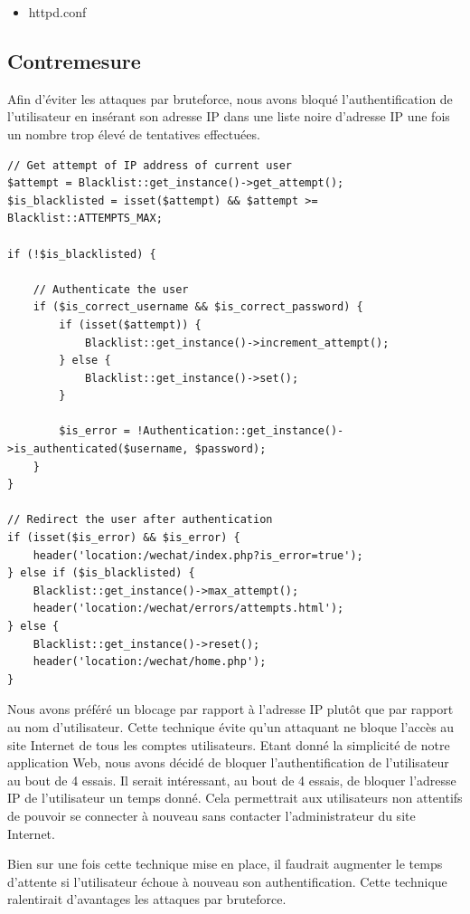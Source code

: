\documentclass[12pt]{article}
\begin{document}
\begin{itemize}
\item httpd.conf
\end{itemize}

\newpage
\subsection{Contremesure}\label{c6}

Afin d'éviter les attaques par bruteforce, nous avons bloqué l'authentification de l'utilisateur en insérant son adresse IP dans une liste noire d'adresse IP une fois un nombre trop élevé de tentatives effectuées.

\begin{lstlisting}[style=JAVA]
// Get attempt of IP address of current user
$attempt = Blacklist::get_instance()->get_attempt();
$is_blacklisted = isset($attempt) && $attempt >= Blacklist::ATTEMPTS_MAX;

if (!$is_blacklisted) {
    
    // Authenticate the user
    if ($is_correct_username && $is_correct_password) {
        if (isset($attempt)) {
            Blacklist::get_instance()->increment_attempt();
        } else {
            Blacklist::get_instance()->set();
        }

        $is_error = !Authentication::get_instance()->is_authenticated($username, $password);
    }
}

// Redirect the user after authentication
if (isset($is_error) && $is_error) {
    header('location:/wechat/index.php?is_error=true');
} else if ($is_blacklisted) {
    Blacklist::get_instance()->max_attempt();
    header('location:/wechat/errors/attempts.html');
} else {
    Blacklist::get_instance()->reset();
    header('location:/wechat/home.php');
}
\end{lstlisting}

Nous avons préféré un blocage par rapport à l'adresse IP plutôt que par rapport au nom d'utilisateur. Cette technique évite qu'un attaquant ne bloque l'accès au site Internet de tous les comptes utilisateurs. Etant donné la simplicité de notre application Web, nous avons décidé de bloquer l'authentification de l'utilisateur au bout de 4 essais. Il serait intéressant, au bout de 4 essais, de bloquer l'adresse IP de l'utilisateur un temps donné. Cela permettrait aux utilisateurs non attentifs de pouvoir se connecter à nouveau sans contacter l'administrateur du site Internet. 

Bien sur une fois cette technique mise en place, il faudrait augmenter le temps d'attente si l'utilisateur échoue à nouveau son authentification. Cette technique ralentirait d'avantages les attaques par bruteforce. 
\end{document}
